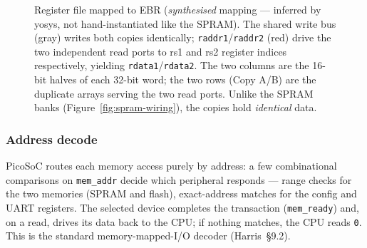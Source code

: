 \documentclass[9pt, a4paper]{extarticle}
\begin{document}
\begin{figure}[htbp]
    \caption{Register file mapped to EBR (\emph{synthesised} mapping --- inferred by yosys, not hand-instantiated like the SPRAM). The shared write bus (gray) writes both copies identically; \texttt{raddr1}/\texttt{raddr2} (red) drive the two independent read ports to rs1 and rs2 register indices respectively, yielding \texttt{rdata1}/\texttt{rdata2}. The two columns are the 16-bit halves of each 32-bit word; the two rows (Copy A/B) are the duplicate arrays serving the two read ports. Unlike the SPRAM banks (Figure~\ref{fig:spram-wiring}), the copies hold \emph{identical} data.}
    \label{fig:regfile-ebr}
\end{figure}

\clearpage
\subsubsection{Address decode}

PicoSoC routes each memory access purely by address: a few combinational comparisons on \texttt{mem\_addr} decide which peripheral responds --- range checks for the two memories (SPRAM and flash), exact-address matches for the config and UART registers. The selected device completes the transaction (\texttt{mem\_ready}) and, on a read, drives its data back to the CPU; if nothing matches, the CPU reads \texttt{0}. This is the standard memory-mapped-I/O decoder (Harris~\S9.2).
\end{document}
